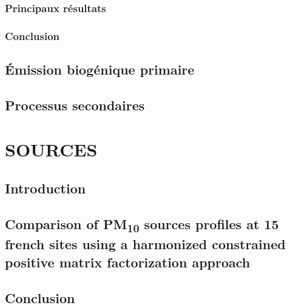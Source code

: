 \subsubsection{Principaux résultats}%
\label{ssub:principaux_résultats}

\subsubsection{Conclusion}%
\label{ssub:conclusion}



\subsection{Émission biogénique primaire}%
\label{sub:émission_biogénique_primaire}

\subsection{Processus secondaires}%
\label{sub:processus_secondaires}

\section{SOURCES}%
\label{sec:sources}

\subsection{Introduction}

\subsection{Comparison of PM\textsubscript{10} sources profiles at 15 french sites using a harmonized constrained positive matrix factorization approach}%
\label{sub:article}

\subsection{Conclusion}%
\label{sub:conclusion}



% 

%
% 


